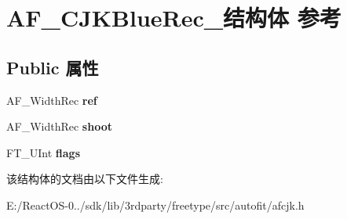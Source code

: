 \hypertarget{struct_a_f___c_j_k_blue_rec__}{}\section{A\+F\+\_\+\+C\+J\+K\+Blue\+Rec\+\_\+结构体 参考}
\label{struct_a_f___c_j_k_blue_rec__}
\subsection*{Public 属性}
\begin{DoxyCompactItemize}
\item 
\mbox{\label{struct_a_f___c_j_k_blue_rec___aba8d0c59e133e266ede02f0dfe9d76e0}} 
A\+F\+\_\+\+Width\+Rec {\bfseries ref}
\item 
\mbox{\label{struct_a_f___c_j_k_blue_rec___a39c6eacbbe942571101e3ec0f9b3b621}} 
A\+F\+\_\+\+Width\+Rec {\bfseries shoot}
\item 
\mbox{\label{struct_a_f___c_j_k_blue_rec___a5cc3a59d1029c2ff91fd5c9def04bbbc}} 
F\+T\+\_\+\+U\+Int {\bfseries flags}
\end{DoxyCompactItemize}


该结构体的文档由以下文件生成\+:\begin{DoxyCompactItemize}
\item 
E\+:/\+React\+O\+S-\/0../sdk/lib/3rdparty/freetype/src/autofit/afcjk.\+h\end{DoxyCompactItemize}
